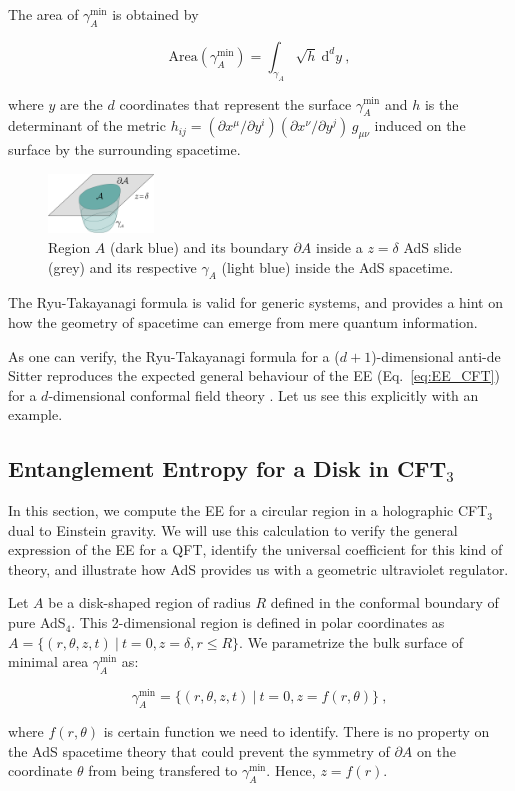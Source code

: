 \documentclass[twocolumn]{revtex4-2}
\providecommand{\eq}[2]{
    \begin{equation}
        #2
    \label{eq:#1}
    \end{equation}
}
\begin{document}
The area of $\gamma_A^\text{min}$ is obtained by
\eq{EE_RT-area}{
    \text{Area}(\gamma_A^\text{min}) = \int_{\gamma_A} \sqrt{h} \ \mathrm{d}^{d}y \ ,
}
where $y$ are the $d$ coordinates that represent the surface $\gamma_A^\text{min}$ and $h$ is the determinant of the metric $h_{ij} = (\partial x^\mu / \partial y^i) (\partial x^\nu / \partial y^j) \, g_{\mu\nu}$ induced on the surface by the surrounding spacetime.

\begin{figure}
    \centering
    \includegraphics[width=0.25\textwidth]{../imatges/EE_AdS-CFT.png}
\caption{Region $A$ (dark blue) and its boundary $\partial A$ inside a $z=\delta$ AdS slide (grey) and its respective $\gamma_A$ (light blue) inside the AdS spacetime.}
\label{fig:EE_AdS-CFT}
\end{figure}

The Ryu-Takayanagi formula is valid for generic systems, and provides a hint on how the geometry of spacetime can emerge from mere quantum information.

As one can verify, the Ryu-Takayanagi formula for a ($d+1$)-dimensional anti-de Sitter reproduces the expected general behaviour of the EE (Eq.~\ref{eq:EE_CFT}) for a $d$-dimensional conformal field theory \cite{ryu_aspects_2006, nishioka_holographic_2009}. Let us see this explicitly with an example.


\subsection{Entanglement Entropy for a Disk in CFT$_3$} \label{ss:EE-disk}

In this section, we compute the EE for a circular region in a holographic CFT$_3$ dual to Einstein gravity. We will use this calculation to verify the general expression of the EE for a QFT, identify the universal coefficient for this kind of theory, and illustrate how AdS provides us with a geometric ultraviolet regulator.

Let $A$ be a disk-shaped region of radius $R$ defined in the conformal boundary of pure AdS$_4$. This 2-dimensional region is defined in polar coordinates as
$
    A = \{ ( r, \theta, z, t ) \ | \ t = 0, z = \delta, r \le R \} 
$. 
We parametrize the bulk surface of minimal area $\gamma_A^\text{min}$ as:
\eq{1gA}{
    \gamma_A^\text{min} = \{ ( r, \theta, z, t ) \ | \ t = 0, z = f (r, \theta) \} \ , \nonumber
}
where $f(r,\theta)$ is certain function we need to identify. There is no property on the AdS spacetime theory that could prevent the symmetry of $\partial A$ on the coordinate $\theta$ from being transfered to $\gamma_A^\text{min}$. Hence, $z=f(r)$.
\end{document}
